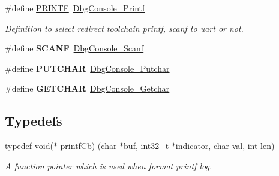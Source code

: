 \begin{DoxyCompactItemize}
\#define \mbox{\hyperlink{group__debugconsole_gae1649fc947ca37a86917a08354f48d1a}{P\+R\+I\+N\+TF}}~\mbox{\hyperlink{group__debugconsole_ga1019139ac1c69fd62687250130c6ca7f}{Dbg\+Console\+\_\+\+Printf}}
\begin{DoxyCompactList}\small\item\em Definition to select redirect toolchain printf, scanf to uart or not. \end{DoxyCompactList}\item 
\mbox{\label{group__debugconsole_ga1799711cd7a7b727846cfe2068f67c66}} 
\#define {\bfseries S\+C\+A\+NF}~\mbox{\hyperlink{group__debugconsole_ga6d87d10b03e4aaf8464206fe3829dd28}{Dbg\+Console\+\_\+\+Scanf}}
\item 
\mbox{\label{group__debugconsole_ga0dc96cafe08557356d4e7f32e850531a}} 
\#define {\bfseries P\+U\+T\+C\+H\+AR}~\mbox{\hyperlink{group__debugconsole_gada572d86a06f028b5b1a5d0440f683e3}{Dbg\+Console\+\_\+\+Putchar}}
\item 
\mbox{\label{group__debugconsole_ga919615abb35a234b304cfeb179cd41de}} 
\#define {\bfseries G\+E\+T\+C\+H\+AR}~\mbox{\hyperlink{group__debugconsole_ga11898c5015274863741c4f3f4d9edc08}{Dbg\+Console\+\_\+\+Getchar}}
\end{DoxyCompactItemize}
\subsection*{Typedefs}
\begin{DoxyCompactItemize}
\item 
\mbox{\label{group__debugconsole_ga85e7bd4e26348dd4b87e4c3a600868c9}} 
typedef void($\ast$ \mbox{\hyperlink{group__debugconsole_ga85e7bd4e26348dd4b87e4c3a600868c9}{printf\+Cb}}) (char $\ast$buf, int32\+\_\+t $\ast$indicator, char val, int len)
\begin{DoxyCompactList}\small\item\em A function pointer which is used when format printf log. \end{DoxyCompactList}\end{DoxyCompactItemize}

